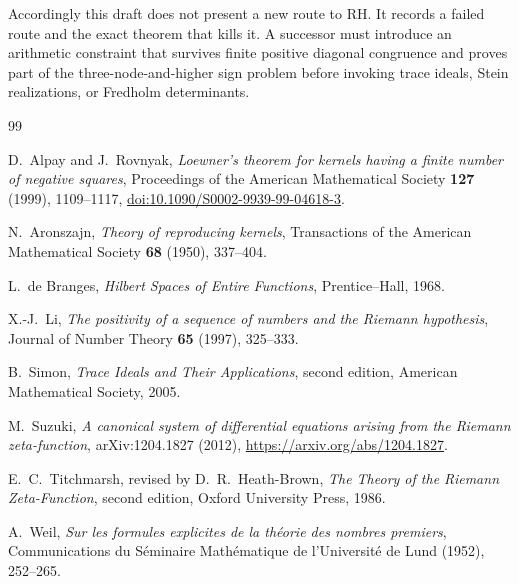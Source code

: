 \documentclass[11pt]{article}
\theoremstyle{definition}
\theoremstyle{remark}
\begin{document}
Accordingly this draft does not present a new route to RH.  It records a failed route and the
exact theorem that kills it.  A successor must introduce an arithmetic constraint that survives
finite positive diagonal congruence and proves part of the three-node-and-higher sign problem
before invoking trace ideals, Stein realizations, or Fredholm determinants.

\begin{thebibliography}{99}

D.~Alpay and J.~Rovnyak,
\emph{Loewner's theorem for kernels having a finite number of negative squares},
Proceedings of the American Mathematical Society \textbf{127} (1999), 1109--1117,
\href{https://doi.org/10.1090/S0002-9939-99-04618-3}{doi:10.1090/S0002-9939-99-04618-3}.

N.~Aronszajn,
\emph{Theory of reproducing kernels},
Transactions of the American Mathematical Society \textbf{68} (1950), 337--404.

L.~de Branges,
\emph{Hilbert Spaces of Entire Functions},
Prentice--Hall, 1968.

X.-J.~Li,
\emph{The positivity of a sequence of numbers and the Riemann hypothesis},
Journal of Number Theory \textbf{65} (1997), 325--333.

B.~Simon,
\emph{Trace Ideals and Their Applications}, second edition,
American Mathematical Society, 2005.

M.~Suzuki,
\emph{A canonical system of differential equations arising from the Riemann zeta-function},
arXiv:1204.1827 (2012),
\url{https://arxiv.org/abs/1204.1827}.

E.~C.~Titchmarsh, revised by D.~R.~Heath-Brown,
\emph{The Theory of the Riemann Zeta-Function}, second edition,
Oxford University Press, 1986.

A.~Weil,
\emph{Sur les formules explicites de la th\'eorie des nombres premiers},
Communications du S\'eminaire Math\'ematique de l'Universit\'e de Lund (1952), 252--265.

\end{thebibliography}
\end{document}
